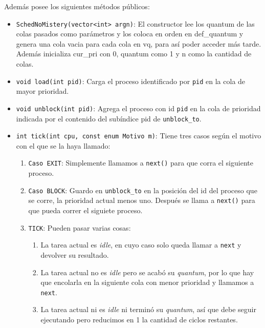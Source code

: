 Además posee los siguientes métodos públicos:
\begin{itemize}
	\item \texttt{SchedNoMistery(vector<int> argn)}: El constructor lee los quantum de las colas pasados como parámetros y los coloca en orden en def\_quantum y genera una cola vacia  para cada cola en vq, para así poder acceder más tarde. Además inicializa cur\_pri con 0, quantum como 1 y n como la cantidad de colas.
	\item \texttt{void load(int pid)}: Carga el proceso identificado por \texttt{pid} en la cola de mayor prioridad. 
	\item \texttt{void unblock(int pid)}: Agrega el proceso con id \texttt{pid} en la cola de prioridad indicada por el contenido del subíndice pid de \texttt{unblock\_to}.
	\item \texttt{int tick(int cpu, const enum Motivo m)}: Tiene tres casos según el motivo con el que se la haya llamado:
	\begin{enumerate}
		\item \texttt{Caso EXIT}: Simplemente llamamos a \texttt{next()} para que corra el siguiente proceso.
		\item \texttt{Caso BLOCK}: Guardo en \texttt{unblock\_to} en la posición del id del proceso que se corre, la prioridad actual menos uno. Después se llama a \texttt{next()} para que pueda correr el siguiete proceso.
		\item \texttt{TICK}: Pueden pasar varias cosas:
		\begin{enumerate}
			\item La tarea actual es \emph{idle}, en cuyo caso solo queda llamar a \texttt{next} y devolver su resultado.
			\item La tarea actual no es \emph{idle} pero se acabó su \emph{quantum}, por lo que hay que encolarla en la siguiente cola con menor prioridad y llamamos a \texttt{next}.
			\item La tarea actual ni es \emph{idle} ni terminó su \emph{quantum}, así que debe seguir ejecutando pero reducimos en 1 la cantidad de ciclos restantes.
		\end{enumerate}
	\end{enumerate}
\end{itemize}
